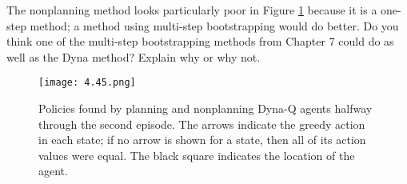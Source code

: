 
\begin{exercise}[Exercise 8.1]

The nonplanning method looks particularly poor in Figure \ref{fig:8.3} because it is a one-step method;
a method using multi-step bootstrapping would do better.
Do you think one of the multi-step bootstrapping methods from Chapter 7 could do as well as the Dyna method?
Explain why or why not.

\setcounter{section}{8}
\setcounter{figure}{2}

\begin{figure}[H]
    \centering
    \texttt{[image: 4.45.png]}
    \caption
    {
        Policies found by planning and nonplanning Dyna-Q agents halfway through the second episode.
        The arrows indicate the greedy action in each state;
        if no arrow is shown for a state, then all of its action values were equal.
        The black square indicates the location of the agent.
    }
    \label{fig:8.3}
\end{figure}

\end{exercise}


\begin{solution}

\phantom{}

\end{solution}

